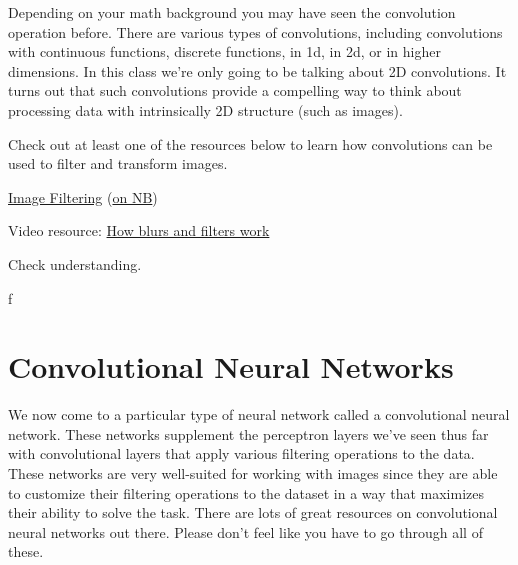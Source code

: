 \documentclass[assignment07_Solutions]{subfiles}
\begin{document}
Depending on your math background you may have seen the convolution operation before.  There are various types of convolutions, including convolutions with continuous functions, discrete functions, in 1d, in 2d, or in higher dimensions.  In this class we're only going to be talking about 2D convolutions.  It turns out that such convolutions provide a compelling way to think about processing data with intrinsically 2D structure (such as images).

Check out at least one of the resources below to learn how convolutions can be used to filter and transform images.

\begin{externalresources}[(30 minutes)]
\bi
\item \href{http://machinelearninguru.com/computer_vision/basics/convolution/image_convolution_1.html}{Image Filtering} (\href{http://nb.mit.edu/f/55484}{on NB})
\item Video resource: \href{https://www.youtube.com/watch?v=C_zFhWdM4ic}{How blurs and filters work}
\ei
\end{externalresources}

\begin{exercise}
Check understanding.

\bes
\item f
\ees
\end{exercise}


\section{Convolutional Neural Networks}
We now come to a particular type of neural network called a convolutional neural network.  These networks supplement the perceptron layers we've seen thus far with convolutional layers that apply various filtering operations to the data.  These networks are very well-suited for working with images since they are able to customize their filtering operations to the dataset in a way that maximizes their ability to solve the task.  There are lots of great resources on convolutional neural networks out there.  Please don't feel like you have to go through all of these.
\end{document}
